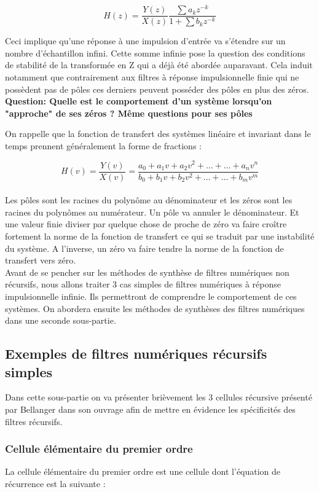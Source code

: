 \documentclass[11pt,a4paper]{article}
\begin{document}
\[  H(z) = \frac{Y(z)}{X(z)} \frac{\sum a_k z^{-k}}{1 + \sum b_k z^{-k}}  \]

Ceci implique qu'une réponse à une impulsion d'entrée va s'étendre sur un nombre d'échantillon infini. Cette somme infinie pose la question des conditions de stabilité de la transformée en Z qui a déjà été abordée auparavant. Cela induit notamment que contrairement aux filtres à réponse impulsionnelle finie qui ne possèdent pas de pôles ces derniers peuvent posséder des pôles en plus des zéros.\\

\textbf{Question: Quelle est le comportement d'un système lorsqu'on "approche" de ses zéros ? Même questions pour ses pôles}

On rappelle que la fonction de transfert des systèmes linéaire et invariant dans le temps prennent généralement la forme de fractions : 

\[ H(v) =  \frac{Y(v)}{X(v)} = \frac{a_0 + a_1 v + a_2 v^2 + ... + \ldots + a_n v^n}{ b_0 +b_1 v + b_2 v^2 + ... + \ldots + b_m v^m} \]\\

Les pôles sont les racines du polynôme au dénominateur et les zéros sont les racines du polynômes au numérateur. Un pôle va annuler le dénominateur. Et une valeur finie diviser par quelque chose de proche de zéro va faire croître fortement la norme de la fonction de transfert ce qui se traduit par une instabilité du système. A l'inverse, un zéro va faire tendre la norme de la fonction de transfert vers zéro.\\

Avant de se pencher sur les méthodes de synthèse de filtres numériques non récursifs, nous allons traiter 3 cas simples de filtres numériques à réponse impulsionnelle infinie. Ils permettront de comprendre le comportement de ces systèmes. On abordera ensuite les méthodes de synthèses des filtres numériques dans une seconde sous-partie.\\

\subsection{Exemples de filtres numériques récursifs simples}
Dans cette sous-partie on va présenter brièvement les 3 cellules récursive présenté par Bellanger dans son ouvrage afin de mettre en évidence les spécificités des filtres récursifs.\\

\subsubsection{Cellule élémentaire du premier ordre}
La cellule élémentaire du premier ordre est une cellule dont l'équation de récurrence est la suivante :\\
\end{document}
